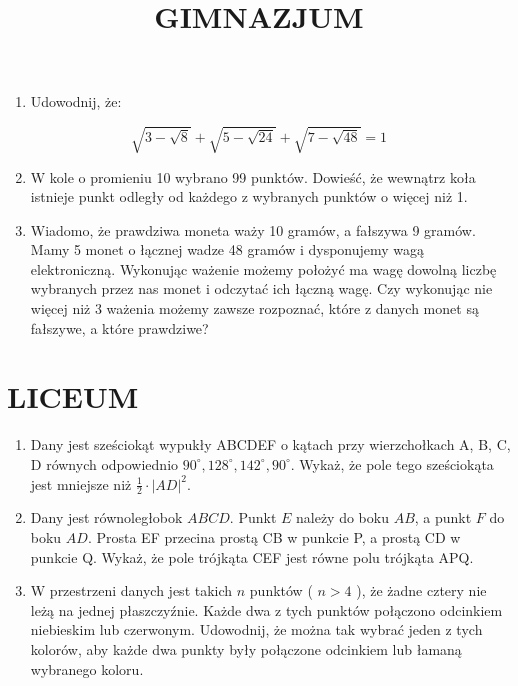 \documentclass[10pt]{article}
\title{GIMNAZJUM }
\author{}
\date{}
\begin{document}
\maketitle
\begin{enumerate}
  \item Udowodnij, że:
\end{enumerate}

\[
\sqrt{3-\sqrt{8}}+\sqrt{5-\sqrt{24}}+\sqrt{7-\sqrt{48}}=1
\]

\begin{enumerate}
  \setcounter{enumi}{1}
  \item W kole o promieniu 10 wybrano 99 punktów. Dowieść, że wewnątrz koła istnieje punkt odległy od każdego z wybranych punktów o więcej niż 1.
  \item Wiadomo, że prawdziwa moneta waży 10 gramów, a fałszywa 9 gramów. Mamy 5 monet o łącznej wadze 48 gramów i dysponujemy wagą elektroniczną. Wykonując ważenie możemy położyć ma wagę dowolną liczbę wybranych przez nas monet i odczytać ich łączną wagę. Czy wykonując nie więcej niż 3 ważenia możemy zawsze rozpoznać, które z danych monet są fałszywe, a które prawdziwe?
\end{enumerate}

\section*{LICEUM}
\begin{enumerate}
  \item Dany jest sześciokąt wypukły ABCDEF o kątach przy wierzchołkach A, B, C, D równych odpowiednio \(90^{\circ}, 128^{\circ}, 142^{\circ}, 90^{\circ}\). Wykaż, że pole tego sześciokąta jest mniejsze niż \(\frac{1}{2} \cdot|A D|^{2}\).
  \item Dany jest równoległobok \(A B C D\). Punkt \(E\) należy do boku \(A B\), a punkt \(F\) do boku \(A D\). Prosta EF przecina prostą CB w punkcie P, a prostą CD w punkcie Q. Wykaż, że pole trójkąta CEF jest równe polu trójkąta APQ.
  \item W przestrzeni danych jest takich \(n\) punktów ( \(n>4\) ), że żadne cztery nie leżą na jednej płaszczyźnie. Każde dwa z tych punktów połączono odcinkiem niebieskim lub czerwonym. Udowodnij, że można tak wybrać jeden z tych kolorów, aby każde dwa punkty były połączone odcinkiem lub łamaną wybranego koloru.
\end{enumerate}
\end{document}
